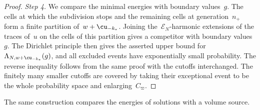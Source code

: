 \documentclass[11pt]{amsart}
\begin{document}
\begin{proof}
\smallskip

\emph{Step 4.} We compare the minimal energies with boundary values~$g$. The cells at which the subdivision stops and the remaining cells at generation~$n_+$ form a finite partition of~$w+\cu_{-k_*}$. Joining the~$\mathscr E_N$-harmonic extensions of the traces of~$u$ on the cells of this partition gives a competitor with boundary values~$g$. The Dirichlet principle then gives the asserted upper bound for~$\Lambda_{N,w+\cu_{-k_*}}(g)$, and all excluded events have exponentially small probability. The reverse inequality follows from the same proof with the cutoffs interchanged. The finitely many smaller cutoffs are covered by taking their exceptional event to be the whole probability space and enlarging~$C_\varpi$.
\end{proof}

The same construction compares the energies of solutions with a volume source.
\end{document}
